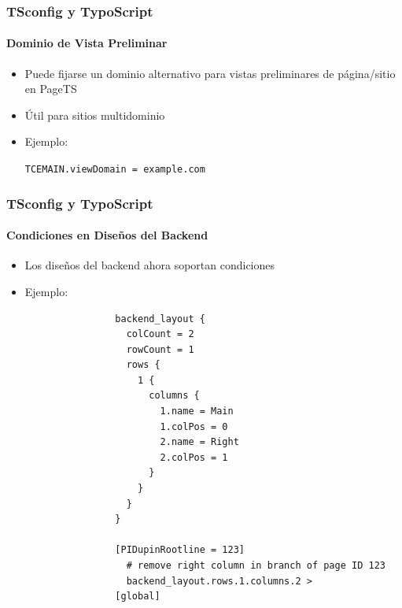 
\begin{frame}[fragile]
	\frametitle{TSconfig y TypoScript}
	\framesubtitle{Dominio de Vista Preliminar}

	\begin{itemize}

		\item Puede fijarse un dominio alternativo para vistas preliminares de página/sitio en PageTS
		\item Útil para sitios multidominio
		\item Ejemplo:

			\lstinline!TCEMAIN.viewDomain = example.com!

	\end{itemize}

\end{frame}


\begin{frame}[fragile]
	\frametitle{TSconfig y TypoScript}
	\framesubtitle{Condiciones en Diseños del Backend}

	\begin{itemize}

		\item Los diseños del backend ahora soportan condiciones
		\item Ejemplo:

			\lstset{
				basicstyle=\tiny\ttfamily
			}

			\begin{lstlisting}
				backend_layout {
				  colCount = 2
				  rowCount = 1
				  rows {
				    1 {
				      columns {
				        1.name = Main
				        1.colPos = 0
				        2.name = Right
				        2.colPos = 1
				      }
				    }
				  }
				}

				[PIDupinRootline = 123]
				  # remove right column in branch of page ID 123
				  backend_layout.rows.1.columns.2 >
				[global]
			\end{lstlisting}

	\end{itemize}

\end{frame}


